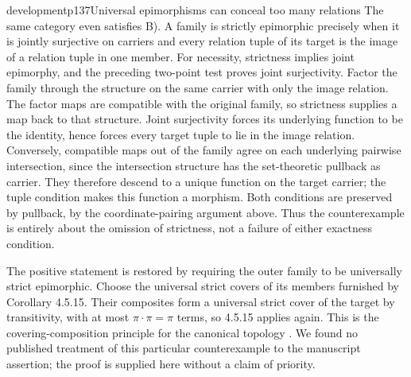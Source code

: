 \begin{dcomment}{development}{p137}{Universal epimorphisms can conceal too many relations}
The same category even satisfies B). A family is strictly epimorphic precisely when it is jointly surjective on carriers and every relation tuple of its target is the image of a relation tuple in one member. For necessity, strictness implies joint epimorphy, and the preceding two-point test proves joint surjectivity. Factor the family through the structure on the same carrier with only the image relation. The factor maps are compatible with the original family, so strictness supplies a map back to that structure. Joint surjectivity forces its underlying function to be the identity, hence forces every target tuple to lie in the image relation. Conversely, compatible maps out of the family agree on each underlying pairwise intersection, since the intersection structure has the set-theoretic pullback as carrier. They therefore descend to a unique function on the target carrier; the tuple condition makes this function a morphism. Both conditions are preserved by pullback, by the coordinate-pairing argument above. Thus the counterexample is entirely about the omission of strictness, not a failure of either exactness condition.

The positive statement is restored by requiring the outer family to be universally strict epimorphic. Choose the universal strict covers of its members furnished by Corollary 4.5.15. Their composites form a universal strict cover of the target by transitivity, with at most $\pi\cdot\pi=\pi$ terms, so 4.5.15 applies again. This is the covering-composition principle for the canonical topology \citep[Expos\'e II, 2.5--2.6]{SGA4I1972}. We found no published treatment of this particular counterexample to the manuscript assertion; the proof is supplied here without a claim of priority.
\end{dcomment}

